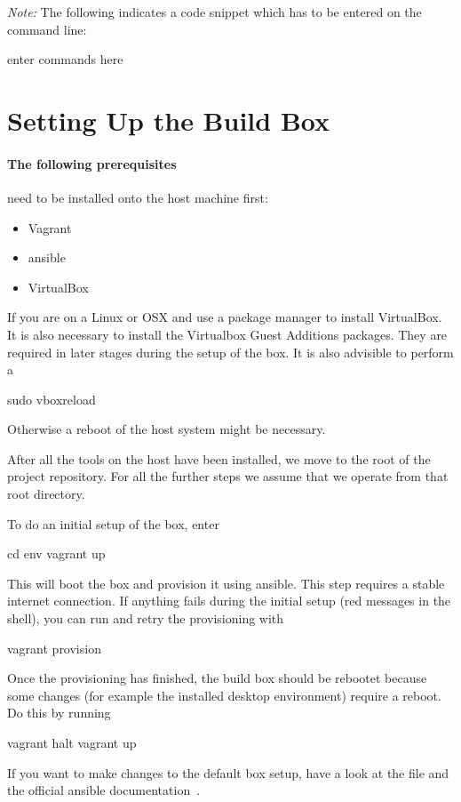 \emph{Note:} The following indicates a code snippet which has to be entered on
the command line:
\begin{commandshell}
    enter commands here
\end{commandshell}

\section{Setting Up the Build Box} %
\label{sec:devguide:fpga_toolchain:buildbox}

\paragraph{The following  prerequisites} need  to be  installed onto  the host
machine first:
\begin{itemize}\tightlist
    \item Vagrant
    \item ansible
    \item VirtualBox
\end{itemize}
If you are on a Linux or OSX  and use a package manager to install VirtualBox.
It is also necessary to install the Virtualbox Guest Additions packages.  They
are  required in  later  stages during  the  setup  of the  box.   It is  also
advisible to perform a
\begin{commandshell}
    sudo vboxreload
\end{commandshell}
\noindent Otherwise a reboot of the host system might be necessary.

After all the  tools on the host have  been installed, we move to  the root of
the project  repository. For all the further  steps we assume that  we operate
from that root directory.

To do an initial setup of the box, enter
\begin{commandshell}
    cd env
    vagrant up
\end{commandshell}
\noindent This  will boot the  box and  provision it using  ansible. This step
requires a  stable internet connection. If  anything fails during  the initial
setup (red messages in the shell), you can run and retry the provisioning with
\begin{commandshell}
    vagrant provision
\end{commandshell}

Once the provisioning  has finished, the build box should  be rebootet because
some  changes  (for  example  the installed  desktop  environment)  require  a
reboot. Do this by running
\begin{commandshell}
    vagrant halt
    vagrant up
\end{commandshell}
\noindent If you  want to make changes  to the default box setup,  have a look
at  the  file \newline\mbox{}  and  the
official ansible documentation~\cite{ansible-docs}.


